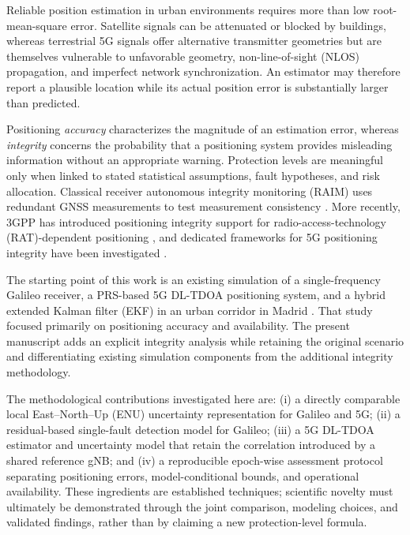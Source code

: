 \documentclass[pdflatex,sn-mathphys-num]{sn-jnl}
\begin{document}
Reliable position estimation in urban environments requires more than low
root-mean-square error. Satellite signals can be attenuated or blocked by
buildings, whereas terrestrial 5G signals offer alternative transmitter
geometries but are themselves vulnerable to unfavorable geometry,
non-line-of-sight (NLOS) propagation, and imperfect network synchronization.
An estimator may therefore report a plausible location while its actual
position error is substantially larger than predicted.

Positioning \emph{accuracy} characterizes the magnitude of an estimation
error, whereas \emph{integrity} concerns the probability that a positioning
system provides misleading information without an appropriate warning.
Protection levels are meaningful only when linked to stated statistical
assumptions, fault hypotheses, and risk allocation. Classical receiver
autonomous integrity monitoring (RAIM) uses redundant GNSS measurements
to test measurement consistency \cite{Brown1992,WalterEnge1995}. More recently,
3GPP has introduced positioning integrity support for radio-access-technology
(RAT)-dependent positioning \cite{ETSI38305}, and dedicated frameworks for
5G positioning integrity have been investigated \cite{Bartoletti2025}.

The starting point of this work is an existing simulation of a single-frequency
Galileo receiver, a PRS-based 5G DL-TDOA positioning system, and a hybrid
extended Kalman filter (EKF) in an urban corridor in Madrid
\cite{SanchezHerederoThesis}. That study focused primarily on positioning
accuracy and availability. The present manuscript adds an explicit integrity
analysis while retaining the original scenario and differentiating existing
simulation components from the additional integrity methodology.

The methodological contributions investigated here are: (i) a directly
comparable local East--North--Up (ENU) uncertainty representation for Galileo
and 5G; (ii) a residual-based single-fault detection model for Galileo; (iii)
a 5G DL-TDOA estimator and uncertainty model that retain the correlation
introduced by a shared reference gNB; and (iv) a reproducible epoch-wise
assessment protocol separating positioning errors, model-conditional bounds,
and operational availability. These ingredients are established techniques;
scientific novelty must ultimately be demonstrated through the joint
comparison, modeling choices, and validated findings, rather than by claiming
a new protection-level formula.
\end{document}

